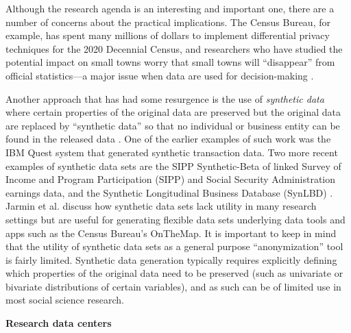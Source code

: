 \documentclass[]{krantz}
\begin{document}
Although the research agenda is an interesting and important one, there
are a number of concerns about the practical implications. The Census
Bureau, for example, has spent many millions of dollars to implement
differential privacy techniques for the 2020 Decennial Census, and
researchers who have studied the potential impact on small towns worry
that small towns will ``disappear'' from official statistics---a major
issue when data are used for decision-making \citep{Wezerek}.

Another approach that has had some resurgence is the use of
\emph{synthetic data} where certain properties of the original data are
preserved but the original data are replaced by ``synthetic data'' so
that no individual or business entity can be found in the released data
\citep{drechsler2011synthetic}. One of the earlier examples of such work
was the IBM Quest system \citep{Agrawal1994} that generated synthetic
transaction data. Two more recent examples of synthetic data sets are
the SIPP Synthetic-Beta \citep{abowd2006final} of linked Survey of
Income and Program Participation (SIPP) and Social Security
Administration earnings data, and the Synthetic Longitudinal Business
Database (SynLBD) \citep{kinney2011towards}. Jarmin et al.
\citeyearpar{jarmin2014expanding} discuss how synthetic data sets lack
utility in many research settings but are useful for generating flexible
data sets underlying data tools and apps such as the Census Bureau's
OnTheMap. It is important to keep in mind that the utility of synthetic
data sets as a general purpose ``anonymization'' tool is fairly limited.
Synthetic data generation typically requires explicitly defining which
properties of the original data need to be preserved (such as univariate
or bivariate distributions of certain variables), and as such can be of
limited use in most social science research.

\textbf{Research data centers}
\end{document}
